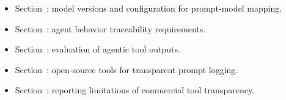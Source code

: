 \begin{itemize}[label=$\rightarrow$]
    \item Section~\modelversion: model versions and configuration for prompt-model mapping.
    \item Section~\toolarchitecture: agent behavior traceability requirements.
    \item Section~\humanvalidation: evaluation of agentic tool outputs.
    \item Section~\openllm: open-source tools for transparent prompt logging.
    \item Section~\limitationsmitigations: reporting limitations of commercial tool transparency.
\end{itemize}
